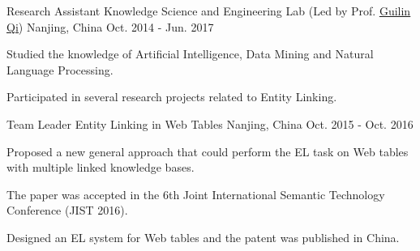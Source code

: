 

\begin{cventries}

  \cventry
    {Research Assistant} %
    {Knowledge Science and Engineering Lab (Led by Prof. \href{http://cse.seu.edu.cn/people/qgl/index.htm}{\underline{Guilin Qi}})} %
    {Nanjing, China} %
    {Oct. 2014 - Jun. 2017} %
    {
      \begin{cvitems} %
        \item {Studied the knowledge of Artificial Intelligence, Data Mining and Natural Language Processing.}
        \item {Participated in several research projects related to Entity Linking.}
      \end{cvitems}
    }

  \cventry
    {Team Leader} %
    {Entity Linking in Web Tables} %
    {Nanjing, China} %
    {Oct. 2015 - Oct. 2016} %
    {
      \begin{cvitems} %
        \item {Proposed a new general approach that could perform the EL task on Web tables with multiple linked knowledge bases.}
        \item {The paper was accepted in the 6th Joint International Semantic Technology Conference (JIST 2016).}
        \item {Designed an EL system for Web tables and the patent was published in China.}
      \end{cvitems}
    }


\end{cventries}
